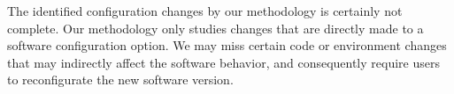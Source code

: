The identified configuration changes by our methodology is certainly not complete.
Our methodology only studies changes that are directly made to a
software configuration option. We may miss certain
code or environment changes that may indirectly affect the software behavior,
and consequently require users to reconfigurate the new software version.




